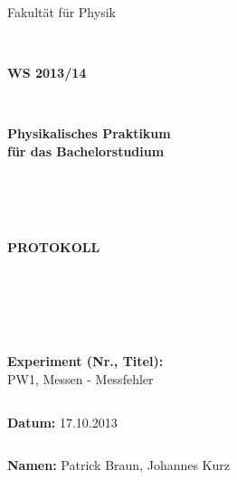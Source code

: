 \documentclass[12pt,a4paper]{article}
\begin{document}
\thispagestyle{empty}
			\begin{center}
			\Large{Fakultät für Physik}\\
			\end{center}
\begin{verbatim}


\end{verbatim}
			\begin{center}
			\textbf{\LARGE WS 2013/14}
			\end{center}
\begin{verbatim}


\end{verbatim}
			\begin{center}
			\textbf{\LARGE{Physikalisches Praktikum\\ für das Bachelorstudium}}
			\end{center}
\begin{verbatim}




\end{verbatim}

			\begin{center}
			\textbf{\LARGE{PROTOKOLL}}
			\end{center}
			
\begin{verbatim}





\end{verbatim}

			\begin{flushleft}
			\textbf{\Large{Experiment (Nr., Titel):}}\\
			\LARGE{PW1, Messen - Messfehler}	
			\end{flushleft}

\begin{verbatim}

\end{verbatim}	
			\begin{flushleft}
			\textbf{\Large{Datum:}} \Large{17.10.2013}
			\end{flushleft}
			
\begin{verbatim}
\end{verbatim}
		\begin{flushleft}
			\textbf{\Large{Namen:}} \Large{Patrick Braun, Johannes Kurz}
			\end{flushleft}
\end{document}
